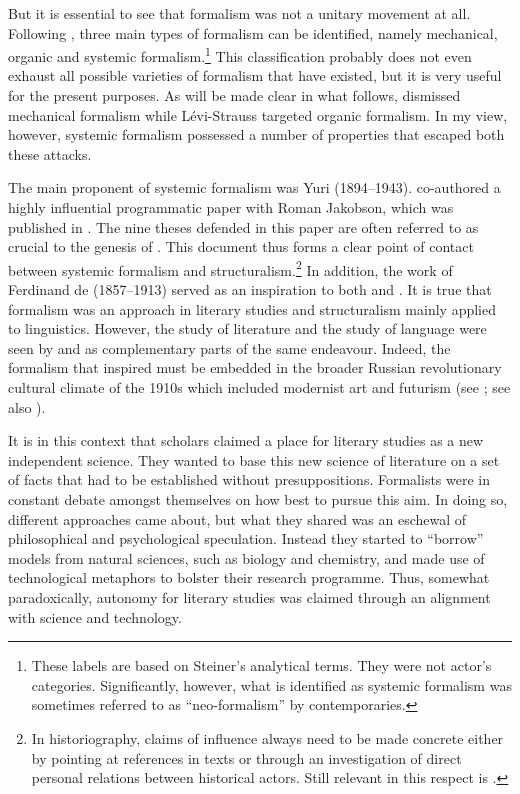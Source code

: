 \documentclass[output=paper]{langscibook}
\begin{document}
But it is essential to see that formalism was not a unitary movement at all. Following \citet{Steiner1984}, three main types of formalism can be identified, namely mechanical, organic and systemic formalism.\footnote{These labels are based on Steiner's analytical terms. They were not actor’s categories. Significantly, however, what is identified as systemic formalism was sometimes referred to as ``neo-formalism'' by contemporaries.} This classification probably does not even exhaust all possible varieties of formalism that have existed, but it is very useful for the present purposes. As will be made clear in what follows, {\Mukarovsky} dismissed mechanical formalism while Lévi-Strauss targeted or\-gan\-ic formalism. In my view, however, systemic formalism possessed a number of properties that escaped both these attacks. 

The main proponent of systemic formalism was Yuri {\Tynjanov} (1894--1943). {\Tynjanov} co-authored a highly influential programmatic paper with Roman Ja\-kob\-son, which was published in \citeyear{Tyjanov1928}. The nine theses defended in this paper are often referred to as crucial to the genesis of . This document thus forms a clear point of contact between systemic formalism and structuralism.\footnote{In historiography, claims of influence always need to be made concrete either by pointing at references in texts or through an investigation of direct personal relations between historical actors. Still relevant in this respect is \citet{Koerner1989}.} In addition, the work of Ferdinand de {\Saussure} (1857--1913) served as an inspiration to both {\Tynjanov} and {\Jakobson}. It is true that formalism was an approach in literary studies and structuralism mainly applied to linguistics. However, the study of literature and the study of language were seen by {\Tynjanov} and {\Jakobson} as complementary parts of the same endeavour. Indeed, the formalism that inspired {\Jakobson} must be embedded in the broader Russian revolutionary cultural climate of the 1910s which included modernist art and futurism (see \citealt[32--33]{Holenstein1975}; see also \citealt{Karstens2017lonely}). 

It is in this context that scholars claimed a place for literary studies as a new independent science. They wanted to base this new science of literature on a set of facts that had to be established without presuppositions. Formalists were in constant debate amongst themselves on how best to pursue this aim. In doing so, different approaches came about, but what they shared was an eschewal of philosophical and psychological speculation. Instead they started to ``borrow'' models from natural sciences, such as biology and chemistry, and made use of technological metaphors to bolster their research programme. Thus, somewhat paradoxically, autonomy for literary studies was claimed through an alignment with science and technology. 
\end{document}
